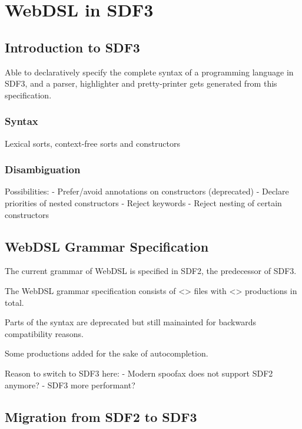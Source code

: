 
\chapter{\label{chap:sdf3}WebDSL in SDF3}

  \section{Introduction to SDF3}

    Able to declaratively specify the complete syntax of a programming language in SDF3, and a parser, highlighter and pretty-printer gets generated from this specification.

    \subsection{Syntax}

      Lexical sorts, context-free sorts and constructors

    \subsection{Disambiguation}

      Possibilities:
      - Prefer/avoid annotations on constructors (deprecated)
      - Declare priorities of nested constructors
      - Reject keywords
      - Reject nesting of certain constructors
  
  \section{WebDSL Grammar Specification}

    The current grammar of WebDSL is specified in SDF2, the predecessor of SDF3.

    The WebDSL grammar specification consists of <> files with <> productions in total.

    Parts of the syntax are deprecated but still mainainted for backwards compatibility reasons.

    Some productions added for the sake of autocompletion.

    Reason to switch to SDF3 here:
    - Modern spoofax does not support SDF2 anymore?
    - SDF3 more performant?

  \section{Migration from SDF2 to SDF3}

